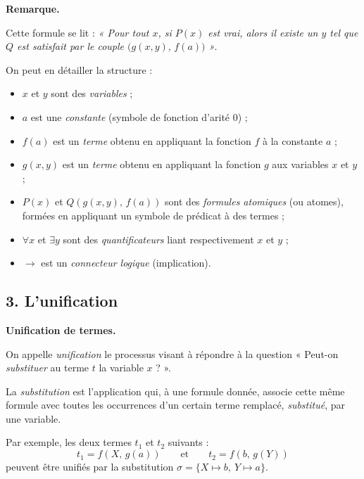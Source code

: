 \documentclass[11pt]{article}
\newenvironment{remarque}{%
    \begin{mdframed}[
        linecolor=sectioncolor!40,
        linewidth=0.8pt,
        backgroundcolor=sectioncolor!5,
        innerleftmargin=10pt,
        innerrightmargin=10pt,
        innertopmargin=6pt,
        innerbottommargin=6pt,
        skipabove=8pt,
        skipbelow=8pt
    ]
    \noindent\textbf{\small\color{sectioncolor}Remarque.}\enspace\small\itshape
}{%
    \end{mdframed}
}
\begin{document}
\begin{remarque}
    Cette formule se lit : \textit{« Pour tout $x$, si $P(x)$ est vrai, alors il existe un $y$
tel que $Q$ est satisfait par le couple $\bigl(g(x, y),\, f(a)\bigr)$ »}.
\end{remarque}

\noindent On peut en détailler la structure :
\begin{itemize}
    \item $x$ et $y$ sont des \textit{variables} ;
    \item $a$ est une \textit{constante} (symbole de fonction d'arité $0$) ;
    \item $f(a)$ est un \textit{terme} obtenu en appliquant la fonction $f$ à la constante $a$ ;
    \item $g(x, y)$ est un \textit{terme} obtenu en appliquant la fonction $g$ aux variables $x$ et $y$ ;
    \item $P(x)$ et $Q\!\left(g(x,y),\, f(a)\right)$ sont des \textit{formules atomiques} (ou atomes),
          formées en appliquant un symbole de prédicat à des termes ;
    \item $\forall x$ et $\exists y$ sont des \textit{quantificateurs} liant respectivement $x$ et $y$ ;
    \item $\rightarrow$ est un \textit{connecteur logique} (implication).
\end{itemize}




\subsection*{3. L'unification}
\label{unification}

\noindent\textbf{Unification de termes.}

\vspace{0.2cm}
On appelle \textit{unification} le processus visant à répondre à la question « Peut-on \textit{substituer} au terme $t$ la variable $x$ ? ».
\vspace{0.4cm}

La \textit{substitution} est l'application qui, à une formule donnée, associe cette même formule avec toutes les occurrences d'un certain terme remplacé, \textit{substitué}, par une variable.
\vspace{0.4cm}

Par exemple, les deux termes $t_1$ et $t_2$ suivants :
$$t_1 = f(X,\, g(a)) \qquad \text{et} \qquad t_2 = f(b,\, g(Y))$$
peuvent être unifiés par la substitution $\sigma = \{X \mapsto b,\ Y \mapsto a\}$.
\vspace{0.4cm}
\end{document}
